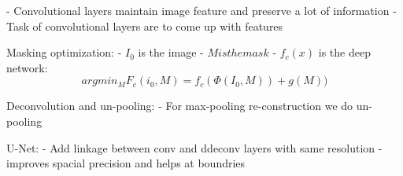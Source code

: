 - Convolutional layers maintain image feature and preserve a lot of information
- Task of convolutional layers are to come up with features

Masking optimization: 
- $I_0$ is the image 
- $M is the mask$ 
- $f_c(x)$ is the deep network: 
\[argmin_M F_c(i_0,M) = f_c(\Phi(I_0,M)) + g(M))\]

Deconvolution and un-pooling:
- For max-pooling re-construction we do un-pooling

U-Net:
- Add linkage between  conv and ddeconv layers with same resolution
- improves spacial precision and helps at boundries

